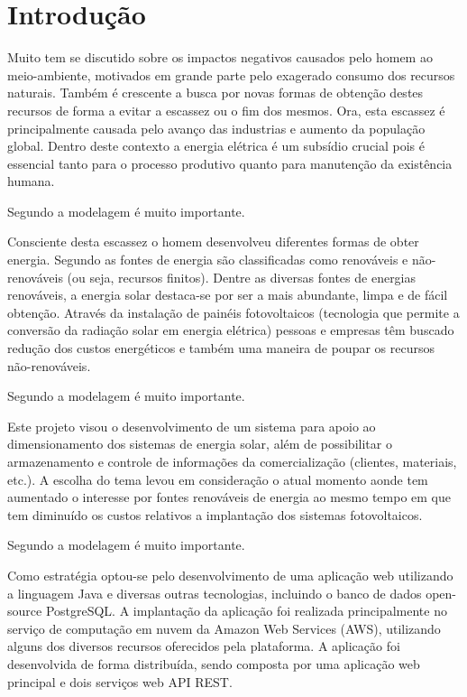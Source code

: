 \chapter{Introdução}
\label{cap-introducao}
Muito tem se discutido sobre os impactos negativos causados pelo homem ao meio-ambiente, motivados em grande parte pelo exagerado consumo dos recursos naturais. Também é crescente a busca por novas formas de obtenção destes recursos de forma a evitar a escassez ou o fim dos mesmos. Ora, esta escassez é principalmente causada pelo avanço das industrias e aumento da população global. Dentro deste contexto a energia elétrica é um subsídio crucial pois é essencial tanto para o processo produtivo quanto para manutenção da existência humana.

Segundo  a modelagem é muito importante.

Consciente desta escassez o homem desenvolveu diferentes formas de obter energia. Segundo  as fontes de energia são classificadas como renováveis e não-renováveis (ou seja, recursos finitos). Dentre as diversas fontes de energias renováveis, a energia solar destaca-se por ser a mais abundante, limpa e de fácil obtenção. Através da instalação de painéis fotovoltaicos (tecnologia que permite a conversão da radiação solar em energia elétrica) pessoas e empresas têm buscado redução dos custos energéticos e também uma maneira de poupar os recursos não-renováveis.


Segundo  a modelagem é muito importante.

Este projeto visou o desenvolvimento de um sistema para apoio ao dimensionamento dos sistemas de energia solar, além de possibilitar o armazenamento e controle de informações da comercialização (clientes, materiais, etc.). A escolha do tema levou em consideração o atual momento aonde tem aumentado o interesse por fontes renováveis de energia ao mesmo tempo em que tem diminuído os custos relativos a implantação dos sistemas fotovoltaicos.


Segundo  a modelagem é muito importante.

Como estratégia optou-se pelo desenvolvimento de uma aplicação web utilizando a linguagem Java e diversas outras tecnologias, incluindo o banco de dados open-source PostgreSQL. A implantação da aplicação foi realizada principalmente no serviço de computação em nuvem da Amazon Web Services (AWS), utilizando alguns dos diversos recursos oferecidos pela plataforma. A aplicação foi desenvolvida de forma distribuída, sendo composta por uma aplicação web principal e dois serviços web API REST. 


